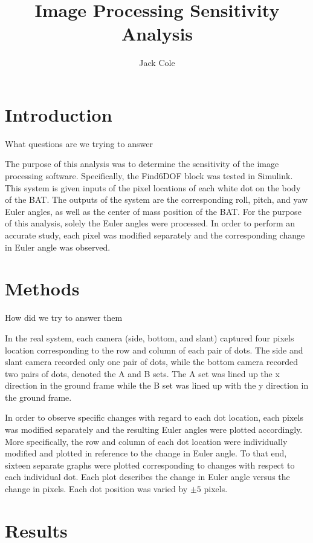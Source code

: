 \documentclass[12pt]{article}
\title{Image Processing Sensitivity Analysis}
\author{Jack Cole}
\date{}
\begin{document}
	
\maketitle

\begin{multicols}{2}
	
\section{Introduction}

What questions are we trying to answer

The purpose of this analysis was to determine the sensitivity of the image processing software. Specifically, the Find6DOF block was tested in Simulink. This system is given inputs of the pixel locations of each white dot on the body of the BAT. The outputs of the system are the corresponding roll, pitch, and yaw Euler angles, as well as the center of mass position of the BAT. For the purpose of this analysis, solely the Euler angles were processed. In order to perform an accurate study, each pixel was modified separately and the corresponding change in Euler angle was observed.

\section{Methods}

How did we try to answer them

In the real system, each camera (side, bottom, and slant) captured four pixels location corresponding to the row and column of each pair of dots. The side and slant camera recorded only one pair of dots, while the bottom camera recorded two pairs of dots, denoted the A and B sets. The A set was lined up the x direction in the ground frame while the B set was lined up with the y direction in the ground frame.

In order to observe specific changes with regard to each dot location, each pixels was modified separately and the resulting Euler angles were plotted accordingly. More specifically, the row and column of each dot location were individually modified and plotted in reference to the change in Euler angle. To that end, sixteen separate graphs were plotted corresponding to changes with respect to each individual dot. Each plot describes the change in Euler angle versus the change in pixels. Each dot position was varied by $\pm 5$ pixels.

\section{Results}


\end{multicols}
\end{document}
